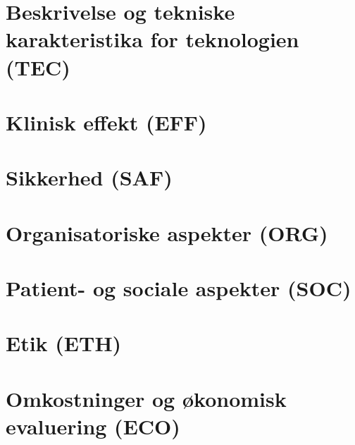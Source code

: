\chapter{Beskrivelse og tekniske karakteristika for teknologien (TEC)}\vspace{-.75cm} \label{TEC_chap}


\chapter{Klinisk effekt (EFF)}\vspace{-.75cm} \label{EFF_chap}


\chapter{Sikkerhed (SAF)}\vspace{-.75cm} \label{SAF_chap}


\chapter{Organisatoriske aspekter (ORG)}\vspace{-.75cm} \label{ORG_chap}


\chapter{Patient- og sociale aspekter (SOC)}\vspace{-.75cm} \label{SOC_chap}


\chapter{Etik (ETH)}\vspace{-.75cm} \label{ETH_chap}


\chapter{Omkostninger og økonomisk evaluering (ECO)}\vspace{-.75cm} \label{ECO_chap}


%
%
%
\cleardoublepage

\begingroup
\label{litteraturliste}
\raggedright


\endgroup

\begin{appendices}
	
	
\end{appendices}


